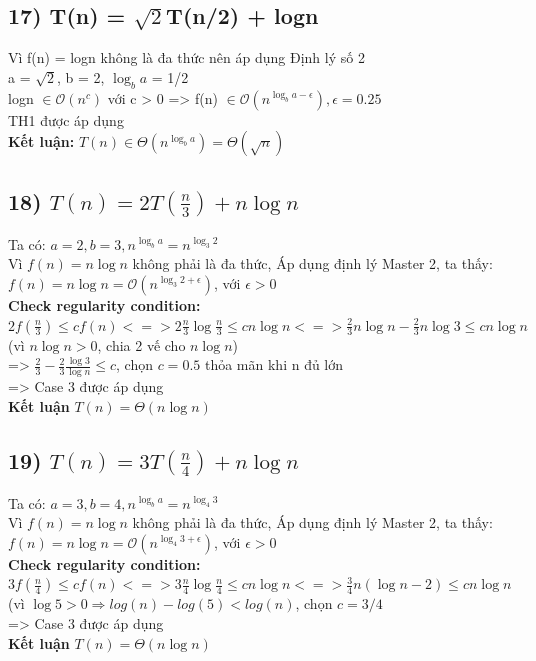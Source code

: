 \documentclass[10pt,a4paper]{article}
\begin{document}
\subsection*{17) T(n) = $\sqrt{2}$T(n/2) + logn}
Vì f(n) = logn không là đa thức nên áp dụng Định lý số 2\\
a = $\sqrt{2}$, b = 2, $\log_b{a}$ = 1/2 \\
logn $\in \mathcal{O}(n^c)$ với c > 0 => f(n) $\in  \mathcal{O}(n^{\log_b{a}-\epsilon}), \epsilon = 0.25$ \\
TH1 được áp dụng\\
\textbf{Kết luận: }$T(n) \in \Theta(n^{\log_b{a}}) = \Theta(\sqrt{n})$
\subsection*{18) $T(n) = 2T(\frac{n}{3}) + n\log{n}$}
Ta có: $a = 2, b = 3 , n^{\log_b{a}} = n^{\log_3{2}}$\\
Vì $f(n) = n\log{n}$ không phải là đa thức, Áp dụng định lý Master 2, ta thấy: \\
$f(n) = n\log{n} = \mathcal{O}(n^{{\log_3{2}} + \epsilon})$, với $\epsilon > 0$\\
\textbf{Check regularity condition:}\\
$2f(\frac{n}{3}) \leq cf(n) <=> 2{\frac{n}{3}}\log{\frac{n}{3}} \leq cn\log{n} <=> \frac{2}{3}n\log{n} - \frac{2}{3}n\log{3} \leq cn\log{n}$ (vì $n\log{n} > 0$, chia 2 vế cho $n\log{n}$) \\
=> $\frac{2}{3} - \frac{2}{3}{\frac{\log{3}}{\log{n}}} \leq c $, chọn $c = 0.5$ thỏa mãn khi n đủ lớn\\ 
=> Case 3 được áp dụng \\
\textbf{Kết luận} $T(n) = \Theta(n\log{n})$
\subsection*{19) $T(n) = 3T(\frac{n}{4}) + n\log{n}$}
Ta có: $a = 3, b = 4 , n^{\log_b{a}} = n^{\log_4{3}}$\\
Vì $f(n) = n\log{n}$ không phải là đa thức, Áp dụng định lý Master 2, ta thấy: \\
$f(n) = n\log{n} = \mathcal{O}(n^{{\log_4{3}} + \epsilon})$, với $\epsilon > 0$\\
\textbf{Check regularity condition:}\\
$3f(\frac{n}{4}) \leq cf(n) <=> 3{\frac{n}{4}}\log{\frac{n}{4}} \leq cn\log{n} <=> \frac{3}{4}n(\log{n} - 2) \leq cn\log{n}$ (vì $\log{5} >0\Rightarrow log(n) - log(5) < log(n)$, chọn $c = 3/4$\\ 
=> Case 3 được áp dụng \\
\textbf{Kết luận} $T(n) = \Theta(n\log{n})$
\end{document}
